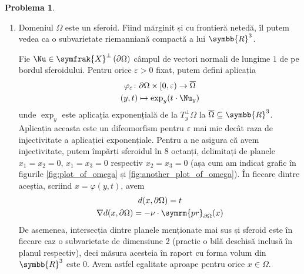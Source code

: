 \documentclass[a4paper, 12pt]{article}
\theoremstyle{definition}
\newtheorem{problem}{Problema}
\newcommand*{\reals}{\symbb{R}}
\begin{document}
\begin{problem}
\begin{enumerate}[1).]
    \item Domeniul \(\Omega\) este un sferoid. Fiind mărginit și cu frontieră netedă, îl putem vedea ca o subvarietate riemanniană compactă a lui \(\reals^3\).

    Fie \(\Nu \in \symfrak{X}^{\perp} \left(\partial \Omega\right)\) câmpul de vectori normali de lungime \(1\) de pe bordul sferoidului. Pentru orice \(\varepsilon > 0\) fixat, putem defini aplicația
    \begin{gather*}
        \varphi_{\varepsilon} \colon \partial \Omega \times [0, \varepsilon) \to \overline{\Omega} \\
        (y, t) \mapsto \exp_{y} (t \cdot \Nu_y)
    \end{gather*}
    unde \(\exp_y\) este aplicația exponențială de la \(T_{y}^{\perp} \Omega\) la \(\overline{\Omega} \subseteq \reals^3\). Aplicația aceasta este un difeomorfism pentru \(\varepsilon\) mai mic decât raza de injectivitate a aplicației exponențiale. Pentru a ne asigura că avem injectivitate, putem împărți sferoidul în 8 octanți, delimitați de planele \(x_1 = x_2 = 0\), \(x_1 = x_3 = 0\) respectiv \(x_2 = x_3 = 0\) (așa cum am indicat grafic în figurile \ref{fig:plot_of_omega} și \ref{fig:another_plot_of_omega}). În fiecare dintre aceștia, scriind \(x = \varphi(y, t)\), avem
    \begin{gather*}
        d(x, \partial \Omega) = t \\
        \nabla d (x, \partial \Omega) = - \nu \cdot \symrm{pr}_{\partial \Omega} (x)
    \end{gather*}
    De asemenea, intersecția dintre planele menționate mai sus și sferoid este în fiecare caz o subvarietate de dimensiune 2 (practic o bilă deschisă inclusă în planul respectiv), deci măsura acesteia în raport cu forma volum din \(\reals^3\) este 0. Avem astfel egalitate aproape pentru orice \(x \in \Omega\).
    

\end{enumerate}
\end{problem}
\end{document}
